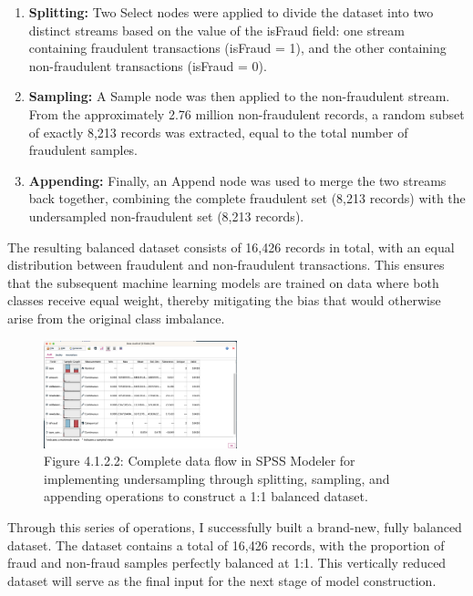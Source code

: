 \documentclass[sigplan,screen]{acmart}
\begin{document}
\begin{enumerate}
    \item \textbf{Splitting:} Two Select nodes were applied to divide the dataset into two distinct streams based on the value of the isFraud field: one stream containing fraudulent transactions (isFraud = 1), and the other containing non-fraudulent transactions (isFraud = 0).
    
    \item \textbf{Sampling:} A Sample node was then applied to the non-fraudulent stream. From the approximately 2.76 million non-fraudulent records, a random subset of exactly 8,213 records was extracted, equal to the total number of fraudulent samples.
    
    \item \textbf{Appending:} Finally, an Append node was used to merge the two streams back together, combining the complete fraudulent set (8,213 records) with the undersampled non-fraudulent set (8,213 records).
\end{enumerate}

The resulting balanced dataset consists of 16,426 records in total, with an equal distribution between fraudulent and non-fraudulent transactions. This ensures that the subsequent machine learning models are trained on data where both classes receive equal weight, thereby mitigating the bias that would otherwise arise from the original class imbalance.

\begin{figure}[H]
    \centering
    \includegraphics[width=0.5\textwidth]{4.1.1.2.png}
    \caption*{Figure 4.1.2.2: Complete data flow in SPSS Modeler for implementing undersampling through splitting, sampling, and appending operations to construct a 1:1 balanced dataset.}
    \label{fig:4.1.2.2}
\end{figure}

Through this series of operations, I successfully built a brand-new, fully balanced dataset. The dataset contains a total of 16,426 records, with the proportion of fraud and non-fraud samples perfectly balanced at 1:1. This vertically reduced dataset will serve as the final input for the next stage of model construction.
\end{document}
